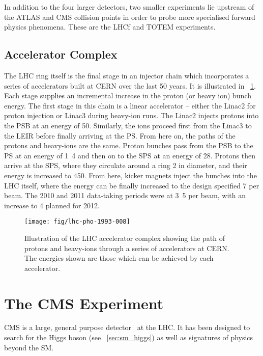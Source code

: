 In addition to the four larger detectors, two smaller experiments lie upstream
of the \ac{ATLAS} and \ac{CMS} collision points in order to probe more
specialised forward physics phenomena. These are the \ac{LHCf} and \ac{TOTEM}
experiments.

\subsection{Accelerator Complex}
The \ac{LHC} ring itself is the final stage in an injector chain which
incorporates a series of accelerators built at CERN over the last 50 years. It
is illustrated in \fig~\ref{fig:expt_lhc}. Each stage supplies an incremental
increase in the proton (or heavy ion) bunch energy. The first stage in this
chain is a linear accelerator -- either the Linac2 for proton injection or
Linac3 during heavy-ion runs. The Linac2 injects protons into the \ac{PSB} at an
energy of \unit{50}{\mega\electronvolt}. Similarly, the ions proceed first from
the Linac3 to the \ac{LEIR} before finally arriving at the \ac{PS}. From here
on, the paths of the protons and heavy-ions are the same. Proton bunches pass
from the \ac{PSB} to the \ac{PS} at an energy of \unit{1.4}{\giga\electronvolt}
and then on to the \ac{SPS} at an energy of
\unit{28}{\giga\electronvolt}. Protons then arrive at the \ac{SPS}, where they
circulate around a ring \unit{2}{\kilo\metre} in diameter, and their energy is
increased to \unit{450}{\giga\electronvolt}. From here, kicker magnets inject
the bunches into the \ac{LHC} itself, where the energy can be finally increased
to the design specified \unit{7}{\TeV} per beam. The 2010 and 2011 data-taking
periods were at \unit{3.5}{\TeV} per beam, with an increase to \unit{4}{\TeV}
planned for 2012.

\begin{figure}[h!]
\texttt{[image: fig/lhc-pho-1993-008]}
\caption[Illustration of the \ac{LHC} accelerator complex]{Illustration of the
  \ac{LHC} accelerator complex showing the path of protons and heavy-ions
  through a series of accelerators at \ac{CERN}. The energies shown are those
  which can be achieved by each accelerator.}
\label{fig:expt_lhc}
\end{figure}

\section{The \acl{CMS} Experiment}
\label{sec:cms}
\ac{CMS} is a large, general purpose detector~\cite{cms_jinst} at the
\ac{LHC}. It has been designed to search for the Higgs boson (see
\sec~\ref{sec:sm_higgs}) as well as signatures of physics beyond the \ac{SM}.

